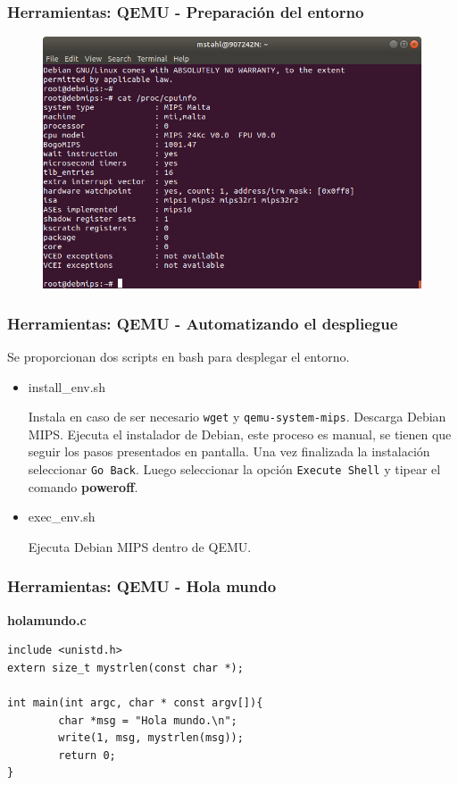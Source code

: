 \documentclass{beamer}
\begin{document}
    \begin{frame}[fragile]
 \frametitle{Herramientas: QEMU - Preparación del entorno} 
\begin{figure}[h!]
 \centering
 \includegraphics[scale=.4,keepaspectratio=true]{./gfx/DebianMips.png}
\end{figure} 
  \end{frame}

    \begin{frame}[fragile]
 \frametitle{Herramientas: QEMU - Automatizando el despliegue} 
Se proporcionan dos scripts en bash para desplegar el entorno.
\begin{itemize}
 \item install\_env.sh
 
 Instala en caso de ser necesario \texttt{wget} y \texttt{qemu-system-mips}. Descarga Debian MIPS. Ejecuta el instalador de Debian, este proceso es manual, se tienen que seguir los pasos presentados en pantalla. Una vez finalizada la instalación seleccionar \texttt{Go Back}. Luego seleccionar la opción \texttt{Execute Shell} y tipear el comando \textbf{poweroff}.
 \item exec\_env.sh
 
 Ejecuta Debian MIPS dentro de QEMU. 
 
\end{itemize}

  \end{frame}  
  
  \begin{frame}[fragile]
 \frametitle{Herramientas: QEMU - Hola mundo} 
\textbf{holamundo.c}
\begin{lstlisting}
include <unistd.h>
extern size_t mystrlen(const char *);

int main(int argc, char * const argv[]){
        char *msg = "Hola mundo.\n";
        write(1, msg, mystrlen(msg));
        return 0;
}

\end{lstlisting}
\end{frame}
\end{document}
